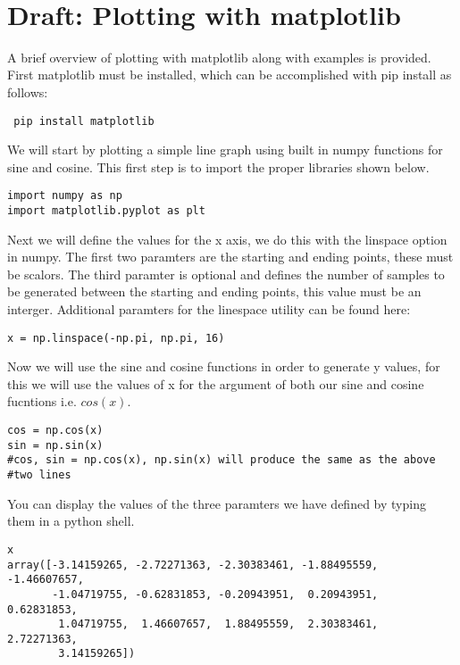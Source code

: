\FILENAME\

\section{Draft: Plotting with matplotlib}\label{matplotlib}

A brief overview of plotting with matplotlib along with examples is
provided. First matplotlib must be installed, which can be
accomplished with pip install as follows:

\begin{lstlisting}
 pip install matplotlib
\end{lstlisting}

We will start by plotting a simple line graph using built in numpy
functions for sine and cosine. This first step is to import the proper
libraries shown below.

\begin{lstlisting}
import numpy as np
import matplotlib.pyplot as plt
\end{lstlisting}

Next we will define the values for the x axis, we do this with the
linspace option in numpy. The first two paramters are the starting and
ending points, these must be scalors. The third paramter is optional
and defines the number of samples to be generated between the starting
and ending points, this value must be an interger. Additional
paramters for the linespace utility can be found here:

\begin{lstlisting}
x = np.linspace(-np.pi, np.pi, 16)
\end{lstlisting}

Now we will use the sine and cosine functions in order to generate y
values, for this we will use the values of x for the argument of both
our sine and cosine fucntions i.e. $cos(x)$.

\begin{lstlisting}
cos = np.cos(x)
sin = np.sin(x)
#cos, sin = np.cos(x), np.sin(x) will produce the same as the above
#two lines
\end{lstlisting} 

You can display the values of the three paramters we have defined by
typing them in a python shell.

\begin{lstlisting}
x
array([-3.14159265, -2.72271363, -2.30383461, -1.88495559, -1.46607657,
       -1.04719755, -0.62831853, -0.20943951,  0.20943951,  0.62831853,
        1.04719755,  1.46607657,  1.88495559,  2.30383461,  2.72271363,
        3.14159265])
\end{lstlisting}

